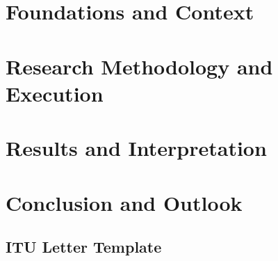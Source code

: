 \documentclass[pnumromarab,noindentfirst]{abnt}
\begin{document}

\part{Foundations and Context}\label{par:introduction}



\part{Research Methodology and Execution}\label{par:methodology}


\part{Results and Interpretation}\label{par:results}



\part{Conclusion and Outlook}\label{par:conclusions}



\makeatletter
\renewcommand\@biblabel[1]{{\parbox{0.8cm}{[#1]}}}
\makeatother




\annex

\chapter{ITU Letter Template}\label{ann:word-template_uk}



\appendix
\end{document}

